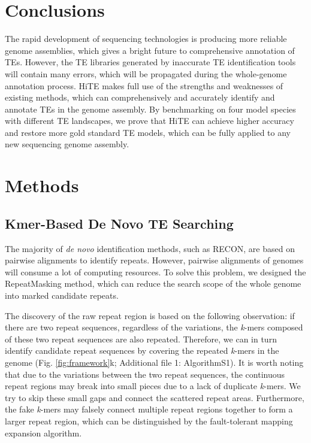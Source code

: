 \documentclass{bmcart}
\begin{document}
\section*{Conclusions}
The rapid development of sequencing technologies is producing more reliable genome assemblies, which gives a bright future to comprehensive annotation of TEs. However, the TE libraries generated by inaccurate TE identification tools will contain many errors, which will be propagated during the whole-genome annotation process. HiTE makes full use of the strengths and weaknesses of existing methods, which can comprehensively and accurately identify and annotate TEs in the genome assembly. By benchmarking on four model species with different TE landscapes, we prove that HiTE can achieve higher accuracy and restore more gold standard TE models, which can be fully applied to any new sequencing genome assembly.

\section*{Methods}

\subsection*{Kmer-Based De Novo TE Searching}
The majority of \emph{de novo} identification methods, such as RECON, are based on pairwise alignments to identify repeats. However, pairwise alignments of genomes will consume a lot of computing resources. To solve this problem, we designed the RepeatMasking method, which can reduce the search scope of the whole genome into marked candidate repeats.

The discovery of the raw repeat region is based on the following observation: if there are two repeat sequences, regardless of the variations, the \emph{k}-mers composed of these two repeat sequences are also repeated. Therefore, we can in turn identify candidate repeat sequences by covering the repeated \emph{k}-mers in the genome (Fig. \ref{fig:framework}k; Additional file 1: AlgorithmS1). It is worth noting that due to the variations between the two repeat sequences, the continuous repeat regions may break into small pieces due to a lack of duplicate \emph{k}-mers. We try to skip these small gaps and connect the scattered repeat areas. Furthermore, the fake \emph{k}-mers may falsely connect multiple repeat regions together to form a larger repeat region, which can be distinguished by the fault-tolerant mapping expansion algorithm.
\end{document}
